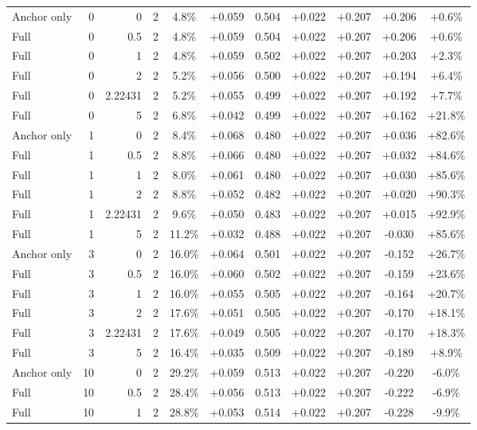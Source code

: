 \begin{table}[htbp]
\begin{tabular}{lrrrccccccc}
Anchor only & 0 & 0 & 2 & 4.8\% & +0.059 & 0.504 & +0.022 & +0.207 & +0.206 & +0.6\% \\
Full & 0 & 0.5 & 2 & 4.8\% & +0.059 & 0.504 & +0.022 & +0.207 & +0.206 & +0.6\% \\
Full & 0 & 1 & 2 & 4.8\% & +0.059 & 0.502 & +0.022 & +0.207 & +0.203 & +2.3\% \\
Full & 0 & 2 & 2 & 5.2\% & +0.056 & 0.500 & +0.022 & +0.207 & +0.194 & +6.4\% \\
Full & 0 & 2.22431 & 2 & 5.2\% & +0.055 & 0.499 & +0.022 & +0.207 & +0.192 & +7.7\% \\
Full & 0 & 5 & 2 & 6.8\% & +0.042 & 0.499 & +0.022 & +0.207 & +0.162 & +21.8\% \\
Anchor only & 1 & 0 & 2 & 8.4\% & +0.068 & 0.480 & +0.022 & +0.207 & +0.036 & +82.6\% \\
Full & 1 & 0.5 & 2 & 8.8\% & +0.066 & 0.480 & +0.022 & +0.207 & +0.032 & +84.6\% \\
Full & 1 & 1 & 2 & 8.0\% & +0.061 & 0.480 & +0.022 & +0.207 & +0.030 & +85.6\% \\
Full & 1 & 2 & 2 & 8.8\% & +0.052 & 0.482 & +0.022 & +0.207 & +0.020 & +90.3\% \\
Full & 1 & 2.22431 & 2 & 9.6\% & +0.050 & 0.483 & +0.022 & +0.207 & +0.015 & +92.9\% \\
Full & 1 & 5 & 2 & 11.2\% & +0.032 & 0.488 & +0.022 & +0.207 & -0.030 & +85.6\% \\
Anchor only & 3 & 0 & 2 & 16.0\% & +0.064 & 0.501 & +0.022 & +0.207 & -0.152 & +26.7\% \\
Full & 3 & 0.5 & 2 & 16.0\% & +0.060 & 0.502 & +0.022 & +0.207 & -0.159 & +23.6\% \\
Full & 3 & 1 & 2 & 16.0\% & +0.055 & 0.505 & +0.022 & +0.207 & -0.164 & +20.7\% \\
Full & 3 & 2 & 2 & 17.6\% & +0.051 & 0.505 & +0.022 & +0.207 & -0.170 & +18.1\% \\
Full & 3 & 2.22431 & 2 & 17.6\% & +0.049 & 0.505 & +0.022 & +0.207 & -0.170 & +18.3\% \\
Full & 3 & 5 & 2 & 16.4\% & +0.035 & 0.509 & +0.022 & +0.207 & -0.189 & +8.9\% \\
Anchor only & 10 & 0 & 2 & 29.2\% & +0.059 & 0.513 & +0.022 & +0.207 & -0.220 & -6.0\% \\
Full & 10 & 0.5 & 2 & 28.4\% & +0.056 & 0.513 & +0.022 & +0.207 & -0.222 & -6.9\% \\
Full & 10 & 1 & 2 & 28.8\% & +0.053 & 0.514 & +0.022 & +0.207 & -0.228 & -9.9\% \\

\end{tabular}
\end{table}
